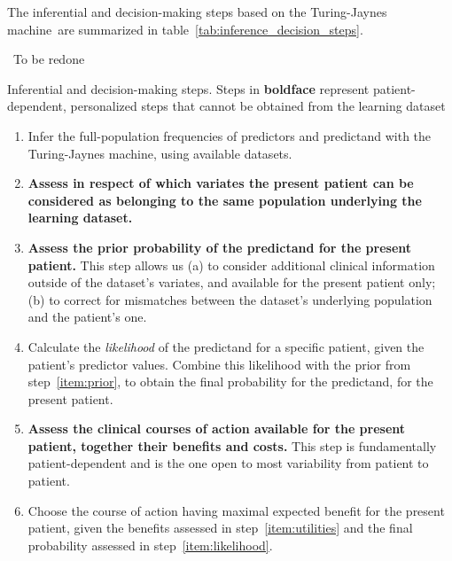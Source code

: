 \documentclass[utf8]{FrontiersinHarvard} %
\newcommand*{\wrench}{{\fontencoding{U}\fontfamily{fontawesomethree}\selectfont\symbol{114}}}
\newcommand{\mynotew}[1]{{\color{notecolour}\wrench\ #1}}
\renewcommand*{\|}[1][]{\nonscript\:#1\vert\nonscript\:\mathopen{}}
\newcommand*{\tjm}{Turing-Jaynes machine}
\begin{document}
The inferential and decision-making steps based on the \tjm\ are summarized in table~\ref{tab:inference_decision_steps}.
\begin{table}[!h]  
  \centering
  \begin{framed}
    \mynotew{To be redone}
    \caption{Inferential and decision-making steps. Steps in \textbf{boldface} represent patient-dependent, personalized steps that cannot be obtained from the learning dataset}\label{tab:inference_decision_steps}

    \vspace{1em}
    
    \begin{enumerate}\itemsep1em 
    \item\label{item:learn} Infer the full-population frequencies of predictors and predictand with the \tjm,  using available datasets.
    \item\label{item:population} \textbf{Assess in respect of which variates the present patient can be considered as belonging to the same population underlying the learning dataset.}
    \item\label{item:prior} \textbf{Assess the prior probability of the predictand for the present patient.} This step allows us (a) to consider additional clinical information outside of the dataset's variates, and available for the present patient only; (b) to correct for mismatches between the dataset's underlying population and the patient's one.
      
    \item\label{item:likelihood}Calculate the \emph{likelihood}
      of the predictand for a specific patient, given the patient's predictor values. Combine this likelihood with the prior from step~\ref{item:prior}, to obtain the final probability for the predictand, for the present patient.

    \item\label{item:utilities} \textbf{Assess the clinical courses of action available for the present patient, together their benefits and costs.} This step is fundamentally patient-dependent and is the one open to most variability from patient to patient.

    \item\label{item:expected_utility} Choose the course of action having maximal expected benefit for the present patient, given the benefits assessed in step~\ref{item:utilities} and the final probability assessed in step~\ref{item:likelihood}.  
    \end{enumerate}
  \end{framed}
\end{table}
\end{document}
